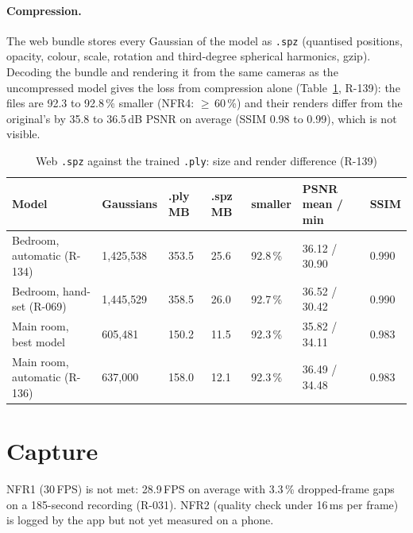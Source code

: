 \paragraph{Compression.} The web bundle stores every Gaussian of the model as \texttt{.spz} (quantised positions,
opacity, colour, scale, rotation and third-degree spherical harmonics, gzip). Decoding the bundle and rendering it from
the same cameras as the uncompressed model gives the loss from compression alone (Table~\ref{tab:eval-spz}, R-139):
the files are 92.3 to 92.8\,\% smaller (NFR4: $\geq$\,60\,\%) and their renders differ from the original's by
35.8 to 36.5\,dB PSNR on average (SSIM 0.98 to 0.99), which is not visible.
\begin{table}[htbp]
\centering\small
\caption{Web \texttt{.spz} against the trained \texttt{.ply}: size and render difference (R-139)}
\label{tab:eval-spz}
\begin{tabular}{p{3.6cm}p{1.6cm}p{1.2cm}p{1.2cm}p{1.4cm}p{2.4cm}p{1.2cm}}
\toprule
\textbf{Model} & \textbf{Gaussians} & \textbf{.ply MB} & \textbf{.spz MB} & \textbf{smaller} & \textbf{PSNR mean / min} & \textbf{SSIM} \\
\midrule
Bedroom, automatic (R-134) & 1{,}425{,}538 & 353.5 & 25.6 & 92.8\,\% & 36.12 / 30.90 & 0.990 \\
Bedroom, hand-set (R-069) & 1{,}445{,}529 & 358.5 & 26.0 & 92.7\,\% & 36.52 / 30.42 & 0.990 \\
Main room, best model & 605{,}481 & 150.2 & 11.5 & 92.3\,\% & 35.82 / 34.11 & 0.983 \\
Main room, automatic (R-136) & 637{,}000 & 158.0 & 12.1 & 92.3\,\% & 36.49 / 34.48 & 0.983 \\
\bottomrule
\end{tabular}
\end{table}

\section{Capture}
NFR1 (30\,FPS) is not met: 28.9\,FPS on average with 3.3\,\% dropped-frame gaps on a 185-second recording (R-031).
NFR2 (quality check under 16\,ms per frame) is logged by the app but not yet measured on a phone.

